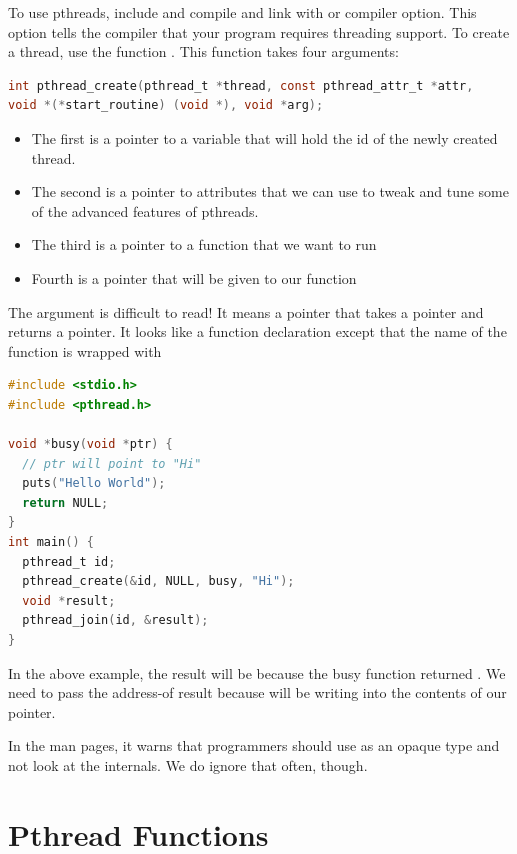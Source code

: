 To use pthreads, include  and compile and link with  or  compiler option.
This option tells the compiler that your program requires threading support.
To create a thread, use the function . This function takes four arguments:

\begin{lstlisting}[language=C]
int pthread_create(pthread_t *thread, const pthread_attr_t *attr,
void *(*start_routine) (void *), void *arg);
\end{lstlisting}

\begin{itemize}
\tightlist
\item
  The first is a pointer to a variable that will hold the id of the newly created thread.
\item
  The second is a pointer to attributes that we can use to tweak and tune some of the advanced features of pthreads.
\item
  The third is a pointer to a function that we want to run
\item
  Fourth is a pointer that will be given to our function
\end{itemize}

The argument  is difficult to read!
It means a pointer that takes a  pointer and returns a  pointer.
It looks like a function declaration except that the name of the function is wrapped with 

\begin{lstlisting}[language=C]
#include <stdio.h>
#include <pthread.h>

void *busy(void *ptr) {
  // ptr will point to "Hi"
  puts("Hello World");
  return NULL;
}
int main() {
  pthread_t id;
  pthread_create(&id, NULL, busy, "Hi");
  void *result;
  pthread_join(id, &result);
}
\end{lstlisting}

In the above example, the result will be  because the busy function returned .
We need to pass the address-of result because  will be writing into the contents of our pointer.

In the man pages, it warns that programmers should use  as an opaque type and not look at the internals.
We do ignore that often, though.

\section{Pthread Functions}

